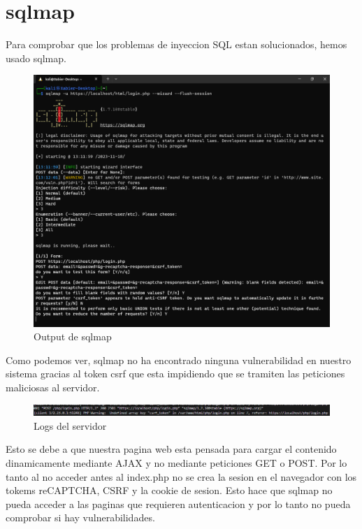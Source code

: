 \documentclass{report}
\begin{document}
        \section{sqlmap}
            Para comprobar que los problemas de inyeccion SQL estan solucionados, hemos usado sqlmap.
            \begin{figure}[H]
                \centering
                \includegraphics[width=\textwidth]{./img/audit2/sqlmap1.png}
                \caption{Output de sqlmap}
            \end{figure}
            Como podemos ver, sqlmap no ha encontrado ninguna vulnerabilidad en nuestro sistema gracias al token csrf que esta impidiendo que se tramiten las peticiones maliciosas al servidor.
            \clearpage
            \begin{figure}[H]
                \centering
                \includegraphics[width=\textwidth]{./img/audit2/sqlmap2.png}
                \caption{Logs del servidor}
            \end{figure}
            Esto se debe a que nuestra pagina web esta pensada para cargar el contenido dinamicamente mediante AJAX y no mediante peticiones GET o POST.
            Por lo tanto al no acceder antes al index.php no se crea la sesion en el navegador con los tokems reCAPTCHA, CSRF y la cookie de sesion.
            Esto hace que sqlmap no pueda acceder a las paginas que requieren autenticacion y por lo tanto no pueda comprobar si hay vulnerabilidades.
        \clearpage
\end{document}
